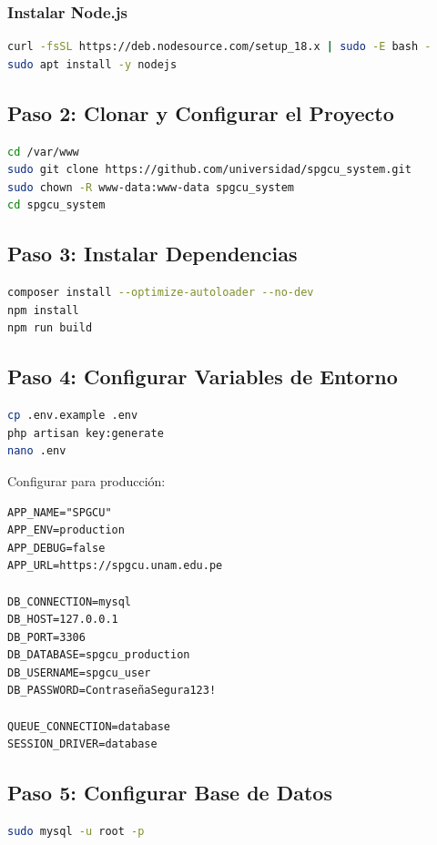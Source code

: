 \documentclass[12pt,a4paper]{article}
\begin{document}
\subsubsection{Instalar Node.js}
\begin{lstlisting}[language=bash]
curl -fsSL https://deb.nodesource.com/setup_18.x | sudo -E bash -
sudo apt install -y nodejs
\end{lstlisting}

\subsection{Paso 2: Clonar y Configurar el Proyecto}

\begin{lstlisting}[language=bash]
cd /var/www
sudo git clone https://github.com/universidad/spgcu_system.git
sudo chown -R www-data:www-data spgcu_system
cd spgcu_system
\end{lstlisting}

\subsection{Paso 3: Instalar Dependencias}
\begin{lstlisting}[language=bash]
composer install --optimize-autoloader --no-dev
npm install
npm run build
\end{lstlisting}

\subsection{Paso 4: Configurar Variables de Entorno}
\begin{lstlisting}[language=bash]
cp .env.example .env
php artisan key:generate
nano .env
\end{lstlisting}

Configurar para producción:
\begin{lstlisting}
APP_NAME="SPGCU"
APP_ENV=production
APP_DEBUG=false
APP_URL=https://spgcu.unam.edu.pe

DB_CONNECTION=mysql
DB_HOST=127.0.0.1
DB_PORT=3306
DB_DATABASE=spgcu_production
DB_USERNAME=spgcu_user
DB_PASSWORD=ContraseñaSegura123!

QUEUE_CONNECTION=database
SESSION_DRIVER=database
\end{lstlisting}

\subsection{Paso 5: Configurar Base de Datos}
\begin{lstlisting}[language=bash]
sudo mysql -u root -p
\end{lstlisting}
\end{document}
